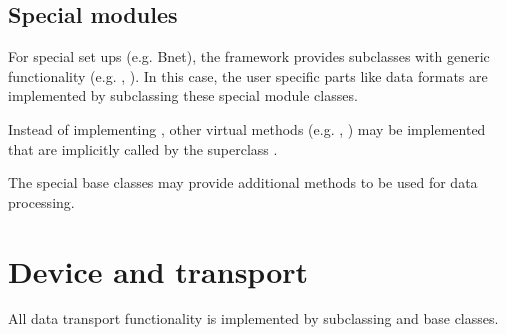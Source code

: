 \subsection{Special modules}
For special set ups (e.g. Bnet), the framework provides 
    subclasses with generic functionality 
   (e.g. , ). 
   In this case, the user specific parts like data formats are 
   implemented by subclassing these special module classes.

   
\begin{compactenum}

\item  Instead of implementing , other virtual 
      methods (e.g. , ) may be 
      implemented that are implicitly called by the superclass .
\item  The special base classes may provide additional 
      methods to be used for data processing.    
\end{compactenum}

\section{Device and transport}
\label{prog_plugin_device}
All data transport functionality is implemented by 
   subclassing   and  base classes.
       
